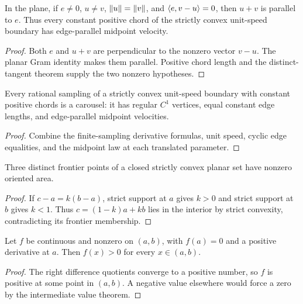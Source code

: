 \begin{lemma}
\label{lem:midpoint-extraction}
\leanok
{}
In the plane, if $e\neq0$, $u\neq v$, $\lVert u\rVert=\lVert v\rVert$, and
$\langle e,v-u\rangle=0$, then $u+v$ is parallel to $e$.
Thus every constant positive chord of the strictly convex unit-speed
boundary has edge-parallel midpoint velocity.
\end{lemma}
\begin{proof}
\leanok
Both $e$ and $u+v$ are perpendicular to the nonzero vector $v-u$.
The planar Gram identity makes them parallel. Positive chord length and
the distinct-tangent theorem supply the two nonzero hypotheses.
\end{proof}

\begin{proposition}
\label{prop:kinematic-extraction}
\leanok
{}
Every rational sampling of a strictly convex unit-speed boundary with
constant positive chords is a carousel: it has regular $C^1$ vertices,
equal constant edge lengths, and edge-parallel midpoint velocities.
\end{proposition}
\begin{proof}
\leanok
Combine the finite-sampling derivative formulas, unit speed, cyclic
edge equalities, and the midpoint law at each translated parameter.
\end{proof}

\begin{lemma}
\label{lem:frontier-triangle}
\leanok
{}
Three distinct frontier points of a closed strictly convex planar set
have nonzero oriented area.
\end{lemma}
\begin{proof}
\leanok
If $c-a=k(b-a)$, strict support at $a$ gives $k>0$ and strict support at
$b$ gives $k<1$. Thus $c=(1-k)a+kb$ lies in the interior by strict
convexity, contradicting its frontier membership.
\end{proof}

\begin{lemma}
\label{lem:interval-sign}
\leanok
Let $f$ be continuous and nonzero on $(a,b)$, with $f(a)=0$ and a
positive derivative at $a$. Then $f(x)>0$ for every $x\in(a,b)$.
\end{lemma}
\begin{proof}
\leanok
The right difference quotients converge to a positive number, so $f$
is positive at some point in $(a,b)$. A negative value elsewhere would
force a zero by the intermediate value theorem.
\end{proof}

